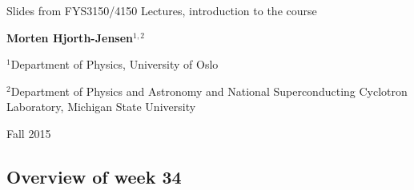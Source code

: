 \documentclass[%
oneside,                 %
final,                   %
10pt]{article}
\begin{document}






\thispagestyle{empty}

\begin{center}
{\LARGE\bf
\begin{spacing}{1.25}
Slides from FYS3150/4150 Lectures, introduction to the course
\end{spacing}
}
\end{center}


\begin{center}
{\bf Morten Hjorth-Jensen${}^{1, 2}$} \\ [0mm]
\end{center}

\begin{center}
\centerline{{\small ${}^1$Department of Physics, University of Oslo}}
\centerline{{\small ${}^2$Department of Physics and Astronomy and National Superconducting Cyclotron Laboratory, Michigan State University}}
\end{center}
    

\begin{center} %
Fall 2015
\end{center}

\vspace{1cm}


\subsection*{Overview of week 34}


\end{document}
